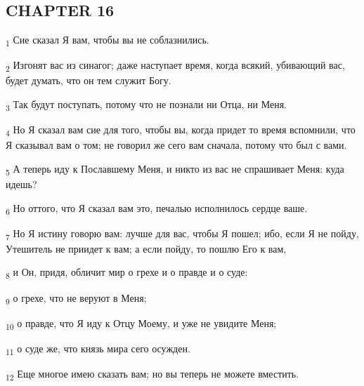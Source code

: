 \subsection{CHAPTER 16}
\begin{tcolorbox}
\textsubscript{1} Сие сказал Я вам, чтобы вы не соблазнились.
\end{tcolorbox}
\begin{tcolorbox}
\textsubscript{2} Изгонят вас из синагог; даже наступает время, когда всякий, убивающий вас, будет думать, что он тем служит Богу.
\end{tcolorbox}
\begin{tcolorbox}
\textsubscript{3} Так будут поступать, потому что не познали ни Отца, ни Меня.
\end{tcolorbox}
\begin{tcolorbox}
\textsubscript{4} Но Я сказал вам сие для того, чтобы вы, когда придет то время вспомнили, что Я сказывал вам о том; не говорил же сего вам сначала, потому что был с вами.
\end{tcolorbox}
\begin{tcolorbox}
\textsubscript{5} А теперь иду к Пославшему Меня, и никто из вас не спрашивает Меня: куда идешь?
\end{tcolorbox}
\begin{tcolorbox}
\textsubscript{6} Но оттого, что Я сказал вам это, печалью исполнилось сердце ваше.
\end{tcolorbox}
\begin{tcolorbox}
\textsubscript{7} Но Я истину говорю вам: лучше для вас, чтобы Я пошел; ибо, если Я не пойду, Утешитель не приидет к вам; а если пойду, то пошлю Его к вам,
\end{tcolorbox}
\begin{tcolorbox}
\textsubscript{8} и Он, придя, обличит мир о грехе и о правде и о суде:
\end{tcolorbox}
\begin{tcolorbox}
\textsubscript{9} о грехе, что не веруют в Меня;
\end{tcolorbox}
\begin{tcolorbox}
\textsubscript{10} о правде, что Я иду к Отцу Моему, и уже не увидите Меня;
\end{tcolorbox}
\begin{tcolorbox}
\textsubscript{11} о суде же, что князь мира сего осужден.
\end{tcolorbox}
\begin{tcolorbox}
\textsubscript{12} Еще многое имею сказать вам; но вы теперь не можете вместить.
\end{tcolorbox}
